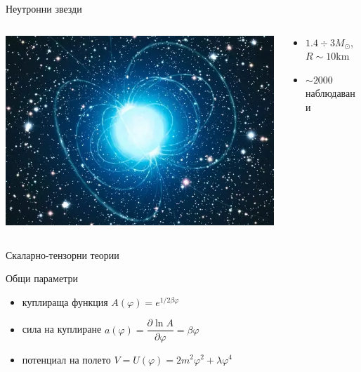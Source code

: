 \documentclass[10pt,a4paper]{beamer}
\begin{document}
        \begin{frame}{ Неутронни звезди }
                \begin{columns}
                    \begin{column}{0.5\textwidth}
                        \includegraphics[width=\textwidth]{images/neutron_star.png}
                    \end{column}
                    \begin{column}{0.5\textwidth}
                        \begin{itemize}
                            \item $ 1.4 \div 3 M_{\odot} $, $ R \sim 10 $km
                            \item $ \sim 2000 $ наблюдавани
                        \end{itemize}
                    \end{column}
                \end{columns}
        \end{frame}
            
        \begin{frame}{ Скаларно-тензорни теории }
            \begin{block}{Общи параметри}
                \begin{itemize}
                    \item куплираща функция $ A(\varphi) = e^{1/2\beta \varphi}$
                    \item сила на куплиране $ a(\varphi) = \dfrac{\partial \ln A}{\partial \varphi} = \beta \varphi$
                    \item потенциал на полето $ V = U(\varphi) = 2m^2\varphi^2 + \lambda\varphi^4$
                \end{itemize}
            \end{block}
        \end{frame}
    
\end{document}
